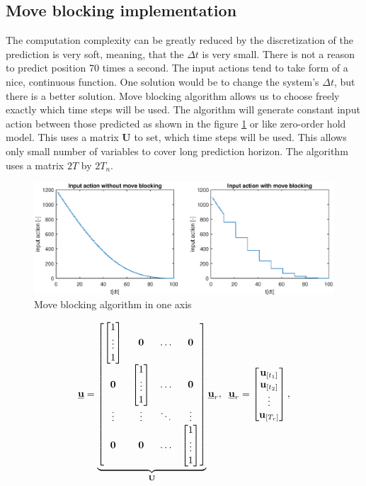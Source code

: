 \documentclass{article}
\newcommand{\uvec}{\textbf{\underline{u}}}
\newcommand{\urvec}{\textbf{\underline{u}}_r}
\begin{document}
\subsection{Move blocking implementation}
The computation complexity can be greatly reduced by the discretization of the prediction is very soft, meaning, that the $\Delta t$ is very small. There is not a reason to predict position 70 times a second. The input actions tend to take form of a nice, continuous function. One solution would be to change the system's $\Delta t$, but there is a better solution. Move blocking algorithm allows us to choose freely exactly which time steps will be used. The algorithm will generate constant input action between those predicted as shown in the figure \ref{fig:move_blocking} or like zero-order hold model. This uses a matrix $\textbf{U}$ to set, which time steps will be used. This allows only small number of variables to cover long prediction horizon. The algorithm uses a matrix $2T$ by $2T_n$.

\begin{figure}[h]
\includegraphics[width=1\textwidth]{fig/move_blocking_u.eps}
\caption{Move blocking algorithm in one axis}
\label{fig:move_blocking}
\end{figure}

\begin{equation}
\uvec = \underbrace{\begin{bmatrix}
\begin{bmatrix}
1\\
\vdots\\
1
\end{bmatrix} & \textbf{0} & \hdots & \textbf{0} \\
\textbf{0} & \begin{bmatrix}
1\\
\vdots\\
1
\end{bmatrix} & \hdots & \textbf{0}\\
\vdots & \vdots & \ddots & \vdots \\
\textbf{0} & \textbf{0} & \hdots & \begin{bmatrix}
1\\
\vdots\\
1
\end{bmatrix}
\end{bmatrix}}_{\textbf{U}}\urvec, \;\;
\urvec = \begin{bmatrix}
\textbf{u}_{[t_1]} \\
\textbf{u}_{[t_2]} \\
\vdots \\
\textbf{u}_{[T_r]}
\end{bmatrix},
\label{eq:moveblocking_example}
\end{equation}
\end{document}

